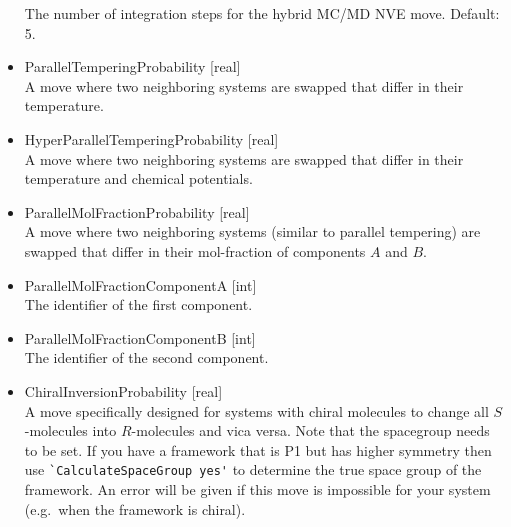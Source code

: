 \begin{itemize}
The number of integration steps for the hybrid MC/MD NVE move. Default: 5.
\item{ParallelTemperingProbability [real]}\\
A move where two neighboring systems 
are swapped that differ in their temperature.
\item{HyperParallelTemperingProbability [real]}\\
A move where two neighboring systems 
are swapped that differ in their temperature
and chemical potentials.
\item{ParallelMolFractionProbability [real]}\\
A move where two neighboring systems (similar to parallel tempering)
are swapped that differ in their mol-fraction of components $A$ and $B$.
\item{ParallelMolFractionComponentA [int]}\\
The identifier of the first component.
\item{ParallelMolFractionComponentB [int]}\\
The identifier of the second component.
\item{ChiralInversionProbability [real]}\\
A move specifically designed for systems with chiral molecules
to change all $S$-molecules into $R$-molecules and vica versa.
Note that the spacegroup needs to be set. If you have a framework that is P1 but has higher symmetry then use \verb=`CalculateSpaceGroup yes'= to
determine the true space group of the framework. An error will be given if this move is impossible for your system (e.g.\ when the framework is chiral).
\end{itemize}

